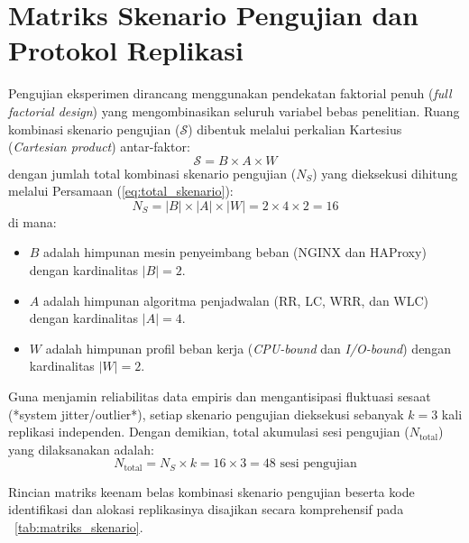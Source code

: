 \section{Matriks Skenario Pengujian dan Protokol Replikasi}
Pengujian eksperimen dirancang menggunakan pendekatan faktorial penuh (\textit{full factorial design}) yang mengombinasikan seluruh variabel bebas penelitian. Ruang kombinasi skenario pengujian ($\mathcal{S}$) dibentuk melalui perkalian Kartesius (\textit{Cartesian product}) antar-faktor:
\begin{equation}
    \mathcal{S} = B \times A \times W
    \label{eq:ruang_skenario}
\end{equation}
dengan jumlah total kombinasi skenario pengujian ($N_S$) yang dieksekusi dihitung melalui Persamaan (\ref{eq:total_skenario}):
\begin{equation}
    N_S = |B| \times |A| \times |W| = 2 \times 4 \times 2 = 16
    \label{eq:total_skenario}
\end{equation}
di mana:
\begin{itemize}[nosep]
    \item $B$ adalah himpunan mesin penyeimbang beban (NGINX dan HAProxy) dengan kardinalitas $|B| = 2$.
    \item $A$ adalah himpunan algoritma penjadwalan (RR, LC, WRR, dan WLC) dengan kardinalitas $|A| = 4$.
    \item $W$ adalah himpunan profil beban kerja (\textit{CPU-bound} dan \textit{I/O-bound}) dengan kardinalitas $|W| = 2$.
\end{itemize}

Guna menjamin reliabilitas data empiris dan mengantisipasi fluktuasi sesaat (*system jitter/outlier*), setiap skenario pengujian dieksekusi sebanyak $k = 3$ kali replikasi independen. Dengan demikian, total akumulasi sesi pengujian ($N_{\text{total}}$) yang dilaksanakan adalah:
\begin{equation}
    N_{\text{total}} = N_S \times k = 16 \times 3 = 48 \text{ sesi pengujian}
    \label{eq:total_eksekusi}
\end{equation}

Rincian matriks keenam belas kombinasi skenario pengujian beserta kode identifikasi dan alokasi replikasinya disajikan secara komprehensif pada \tablename\ \ref{tab:matriks_skenario}.

